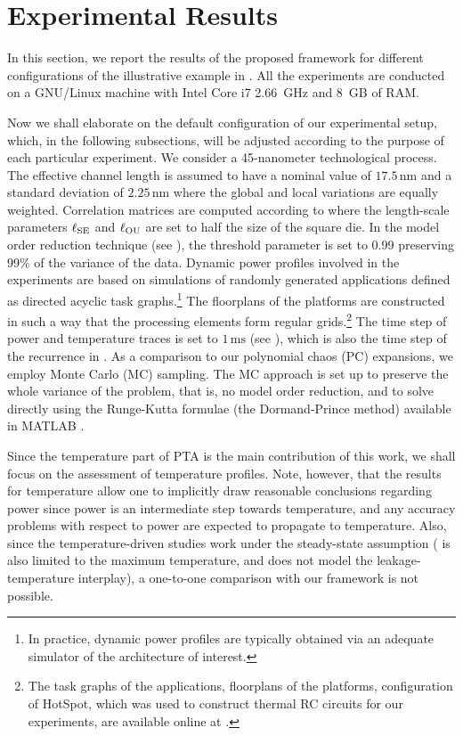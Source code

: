 \section{Experimental Results}

In this section, we report the results of the proposed framework for different
configurations of the illustrative example in . All
the experiments are conducted on a GNU/Linux machine with Intel Core i7 2.66~GHz
and 8~GB of RAM.

Now we shall elaborate on the default configuration of our experimental setup,
which, in the following subsections, will be adjusted according to the purpose
of each particular experiment. We consider a 45-nanometer technological process.
The effective channel length is assumed to have a nominal value of
$17.5\,\text{nm}$ \cite{ptm} and a standard deviation of $2.25\,\text{nm}$ where
the global and local variations are equally weighted. Correlation matrices are
computed according to  where the length-scale
parameters $\ell_{\mathrm{SE}}$ and $\ell_{\mathrm{OU}}$ are set to half the size of the square die.
In the model order reduction technique (see ), the
threshold parameter is set to 0.99 preserving 99\% of the variance of the data.
Dynamic power profiles involved in the experiments are based on simulations of
randomly generated applications defined as directed acyclic task
graphs.\footnote{In practice, dynamic power profiles are typically obtained via
an adequate simulator of the architecture of interest.} The floorplans of the
platforms are constructed in such a way that the processing elements form
regular grids.\footnote{The task graphs of the applications, floorplans of the
platforms, configuration of HotSpot, which was used to construct thermal RC
circuits for our experiments, are available online at \cite{eslab2014}.} The
time step of power and temperature traces is set to $1\,\text{ms}$ (see
), which is also the time step of the recurrence in
. As a comparison to our polynomial chaos (PC) expansions,
we employ Monte Carlo (MC) sampling. The MC approach is set up to preserve the
whole variance of the problem, that is, no model order reduction, and to solve
 directly using the Runge-Kutta formulae (the
Dormand-Prince method) available in MATLAB \cite{matlab}.

Since the temperature part of PTA is the main contribution of this work, we
shall focus on the assessment of temperature profiles. Note, however, that the
results for temperature allow one to implicitly draw reasonable conclusions
regarding power since power is an intermediate step towards temperature, and any
accuracy problems with respect to power are expected to propagate to
temperature. Also, since the temperature-driven studies \cite{juan2011,
juan2012, huang2009a, lee2013} work under the steady-state assumption
(\cite{juan2011} is also limited to the maximum temperature, and
\cite{huang2009a} does not model the leakage-temperature interplay), a
one-to-one comparison with our framework is not possible.

